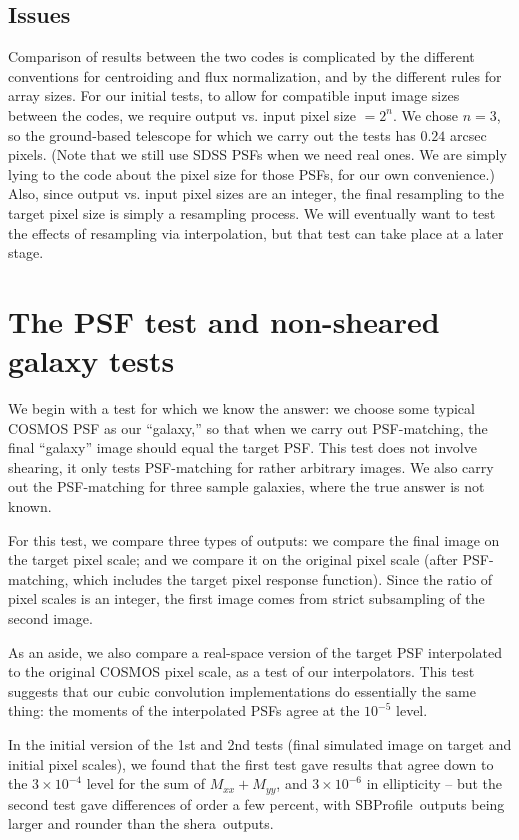 \documentclass[preprint]{aastex}
\newcommand{\shera}{{\sc shera}}
\newcommand{\sbp}{SBProfile}
\newcommand{\mxx}{\ensuremath{M_{xx}}}
\newcommand{\myy}{\ensuremath{M_{yy}}}
\begin{document}
\subsection{Issues}

Comparison of results between the two codes is complicated by the
different conventions for centroiding and flux normalization, and by
the different rules for array sizes. For our initial tests, to allow for compatible input
image sizes between the codes, we require output vs. input pixel size
$=2^n$.  We chose $n=3$, so the ground-based telescope for which we
carry out the tests has $0.24$ arcsec pixels.  (Note that we still use
SDSS PSFs when we need real ones.  We are simply lying to the code
about the pixel size for those PSFs, for our own convenience.)  Also,
since output vs. input pixel sizes are an integer, the final
resampling to the target pixel size is simply a resampling process.
We will eventually want to test the effects of resampling via
interpolation, but that test can take place at a later stage.

\section{The PSF test and non-sheared galaxy tests}

We begin with a test for which we know the answer: we choose some
typical COSMOS PSF as our ``galaxy,'' so that when we carry out
PSF-matching, the final ``galaxy'' image should equal the target PSF.
This test does not involve shearing, it only tests PSF-matching for
rather arbitrary images.  We also carry out the PSF-matching for three
sample galaxies, where the true answer is not known.  

For this test, we compare three types of outputs: we compare the final
image on the target pixel scale; and we compare it on the original pixel
scale (after PSF-matching, which includes the target pixel response
function).  Since the ratio of pixel scales is an integer, the
first image comes from strict subsampling of the second image.

As an aside, we also compare a real-space version of the target PSF
interpolated to the original COSMOS pixel scale, as a test of our
interpolators. This test 
suggests that our cubic convolution implementations do essentially the
same thing: the moments of the interpolated PSFs agree at the
$10^{-5}$ level.

In the initial version of the 1st and 2nd tests (final simulated image
on target and initial pixel scales), we found that the first test gave
results that agree down to the $3\times 10^{-4}$ level for the sum of
$\mxx+\myy$, and $3 \times 10^{-6}$ in ellipticity -- but the second
test gave differences of order a few percent, with \sbp\ outputs being
larger and rounder than the \shera\ outputs.  
\end{document}
